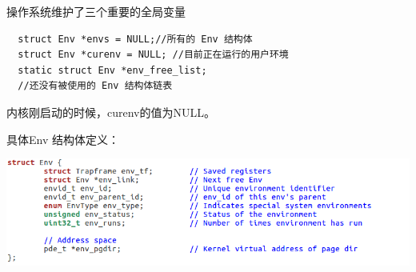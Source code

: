\begin{ExerciseList}
操作系统维护了三个重要的全局变量

\begin{verbatim}
  struct Env *envs = NULL;//所有的 Env 结构体
  struct Env *curenv = NULL; //目前正在运行的用户环境
  static struct Env *env_free_list;
  //还没有被使用的 Env 结构体链表
\end{verbatim}

内核刚启动的时候，curenv的值为NULL。

具体Env 结构体定义：

  \includegraphics[width=6in]{figures/lab2/image52.png}



\end{ExerciseList}
